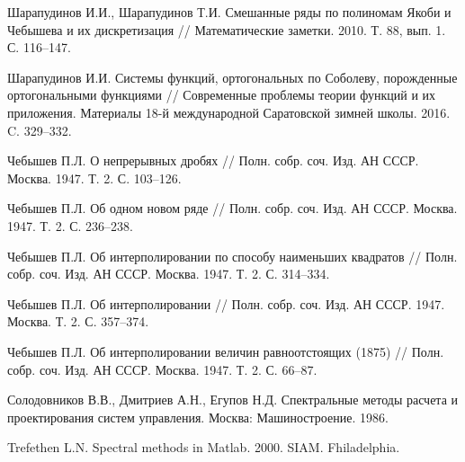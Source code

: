 \begin{thebibliography}{999}
Шарапудинов И.И., Шарапудинов Т.И.
Смешанные ряды по полиномам Якоби и Чебышева и их дискретизация //
Математические заметки. 2010. Т. 88, вып. 1.  С. 116--147.






Шарапудинов И.И.
Системы функций, ортогональных по Соболеву, порожденные ортогональными функциями //
Современные проблемы теории функций и их приложения.  Материалы 18-й международной Саратовской зимней школы. 2016. C. 329--332.





Чебышев П.Л. О непрерывных дробях // Полн. собр. соч. Изд. АН СССР. Москва. 1947. Т. 2. С. 103--126.





Чебышев П.Л. Об одном новом ряде // Полн. собр. соч. Изд. АН СССР. Москва. 1947. Т. 2. С. 236--238.





Чебышев П.Л.
Об интерполировании по способу наименьших квадратов //
Полн. собр. соч. Изд. АН СССР. Москва. 1947. Т. 2. С. 314--334.





Чебышев П.Л. Об интерполировании // Полн. собр. соч. Изд. АН СССР. 1947. Москва. Т. 2. С. 357--374.





Чебышев П.Л.
Об интерполировании величин  равноотстоящих (1875) //
Полн. собр. соч. Изд. АН СССР. Москва. 1947. Т. 2. С. 66--87.





Солодовников В.В., Дмитриев А.Н., Егупов Н.Д.
Спектральные методы расчета и проектирования систем управления. Москва: Машиностроение. 1986.






Trefethen L.N. Spectral methods in Matlab. 2000. SIAM. Fhiladelphia.






\end{thebibliography}
